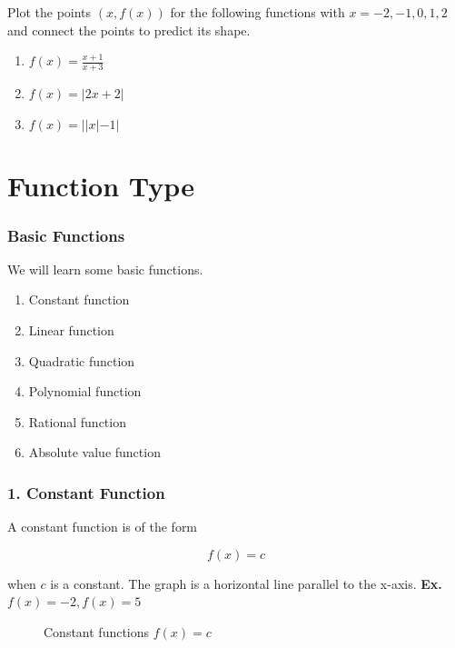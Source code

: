 \begin{frame}
\begin{exercisebox}{}
Plot the points $(x,f(x))$ for the following functions with $x=-2,-1,0,1,2$ and connect the points to predict its shape.
\begin{enumerate}
\item $f(x) = \frac{x+1}{x+3}$
\item $f(x) = |2x+2|$
\item $f(x) = ||x|-1|$
\end{enumerate}
\end{exercisebox}
\end{frame}

\section{Function Type}
\frame{\sectionpage}

\begin{frame}
\frametitle{Basic Functions}
We will learn some basic functions.
\begin{enumerate}
\item Constant function
\item Linear function
\item Quadratic function
\item Polynomial function
\item Rational function
\item Absolute value function
\end{enumerate}
\end{frame}

\begin{frame}
\frametitle{1. Constant Function}
A constant function is of the form
\begin{block}{}\[f(x) = c\]\end{block} 
when $c$ is a constant. The graph is a horizontal line parallel to the x-axis. \pause
\textbf{Ex.}  $f(x) = -2, f(x) = 5$ \pause


\begin{figure}[h!]
\centering
{}
\caption{Constant functions $f(x) = c$}
\end{figure}
\end{frame}

